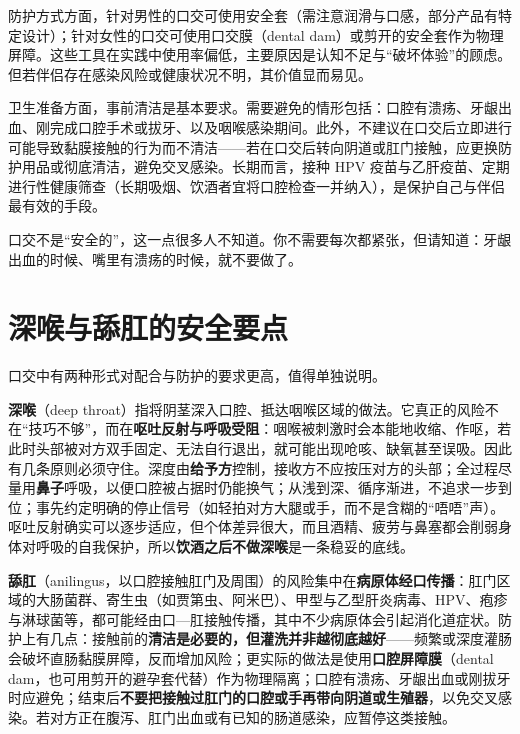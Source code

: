 \documentclass[12pt,UTF8]{ctexbook}
\newcommand{\keyword}[1]{\textbf{#1}}
\begin{document}
防护方式方面，针对男性的口交可使用安全套（需注意润滑与口感，部分产品有特定设计）；针对女性的口交可使用口交膜（dental dam）或剪开的安全套作为物理屏障。这些工具在实践中使用率偏低，主要原因是认知不足与“破坏体验”的顾虑。但若伴侣存在感染风险或健康状况不明，其价值显而易见。

卫生准备方面，事前清洁是基本要求。需要避免的情形包括：口腔有溃疡、牙龈出血、刚完成口腔手术或拔牙、以及咽喉感染期间。此外，不建议在口交后立即进行可能导致黏膜接触的行为而不清洁——若在口交后转向阴道或肛门接触，应更换防护用品或彻底清洁，避免交叉感染。长期而言，接种 HPV 疫苗与乙肝疫苗、定期进行性健康筛查（长期吸烟、饮酒者宜将口腔检查一并纳入），是保护自己与伴侣最有效的手段。

\begin{tcolorbox}[colback=pink!5!white,colframe=red!50!black,title=贴心小叮咛]
口交不是“安全的”，这一点很多人不知道。你不需要每次都紧张，但请知道：牙龈出血的时候、嘴里有溃疡的时候，就不要做了。
\end{tcolorbox}

\section{深喉与舔肛的安全要点}

口交中有两种形式对配合与防护的要求更高，值得单独说明。

\keyword{深喉}（deep throat）指将阴茎深入口腔、抵达咽喉区域的做法。它真正的风险不在“技巧不够”，而在\keyword{呕吐反射与呼吸受阻}：咽喉被刺激时会本能地收缩、作呕，若此时头部被对方双手固定、无法自行退出，就可能出现呛咳、缺氧甚至误吸。因此有几条原则必须守住。深度由\keyword{给予方}控制，接收方不应按压对方的头部；全过程尽量用\keyword{鼻子}呼吸，以便口腔被占据时仍能换气；从浅到深、循序渐进，不追求一步到位；事先约定明确的停止信号（如轻拍对方大腿或手，而不是含糊的“唔唔”声）。呕吐反射确实可以逐步适应，但个体差异很大，而且酒精、疲劳与鼻塞都会削弱身体对呼吸的自我保护，所以\keyword{饮酒之后不做深喉}是一条稳妥的底线。

\keyword{舔肛}（anilingus，以口腔接触肛门及周围）的风险集中在\keyword{病原体经口传播}：肛门区域的大肠菌群、寄生虫（如贾第虫、阿米巴）、甲型与乙型肝炎病毒、HPV、疱疹与淋球菌等，都可能经由口—肛接触传播，其中不少病原体会引起消化道症状。防护上有几点：接触前的\keyword{清洁是必要的，但灌洗并非越彻底越好}——频繁或深度灌肠会破坏直肠黏膜屏障，反而增加风险；更实际的做法是使用\keyword{口腔屏障膜}（dental dam，也可用剪开的避孕套代替）作为物理隔离；口腔有溃疡、牙龈出血或刚拔牙时应避免；结束后\keyword{不要把接触过肛门的口腔或手再带向阴道或生殖器}，以免交叉感染。若对方正在腹泻、肛门出血或有已知的肠道感染，应暂停这类接触。
\end{document}
